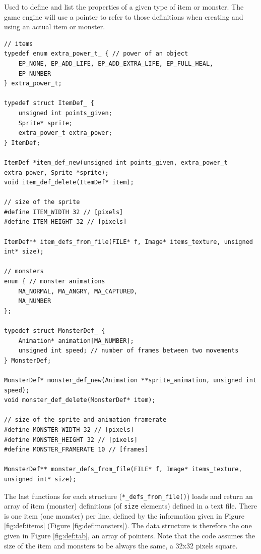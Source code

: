 \documentclass[12pt,a4paper]{article}
\newcommand{\cc}[1]{\texttt{#1}}
\begin{document}
Used to define and list the properties of a given type of item or monster. The game engine will use a pointer to refer to those definitions when creating and using an actual item or monster.

\begin{verbatim}
// items
typedef enum extra_power_t_ { // power of an object
	EP_NONE, EP_ADD_LIFE, EP_ADD_EXTRA_LIFE, EP_FULL_HEAL,
	EP_NUMBER
} extra_power_t;

typedef struct ItemDef_ {
	unsigned int points_given;
	Sprite* sprite;
	extra_power_t extra_power;
} ItemDef;

ItemDef *item_def_new(unsigned int points_given, extra_power_t extra_power, Sprite *sprite);
void item_def_delete(ItemDef* item);

// size of the sprite
#define ITEM_WIDTH 32 // [pixels]
#define ITEM_HEIGHT 32 // [pixels]

ItemDef** item_defs_from_file(FILE* f, Image* items_texture, unsigned int* size);

// monsters
enum { // monster animations
    MA_NORMAL, MA_ANGRY, MA_CAPTURED,
    MA_NUMBER
};

typedef struct MonsterDef_ {
	Animation* animation[MA_NUMBER];
	unsigned int speed; // number of frames between two movements
} MonsterDef;

MonsterDef* monster_def_new(Animation **sprite_animation, unsigned int speed);
void monster_def_delete(MonsterDef* item);

// size of the sprite and animation framerate
#define MONSTER_WIDTH 32 // [pixels]
#define MONSTER_HEIGHT 32 // [pixels]
#define MONSTER_FRAMERATE 10 // [frames]

MonsterDef** monster_defs_from_file(FILE* f, Image* items_texture, unsigned int* size);
\end{verbatim}


The last functions for each structure (\cc{*_defs_from_file()}) loads and return an array of item (monster) definitions (of \cc{size} elements) defined in a text file. There is one item (one monster) per line, defined by the information given in Figure \ref{fig:def:items} (Figure \ref{fig:def:monsters}). The data structure is therefore the one given in Figure \ref{fig:def:tab}, an array of pointers. Note that the code assumes the size of the item and monsters to be always the same, a 32x32 pixels square.
\end{document}

